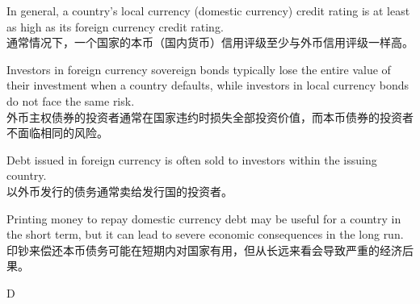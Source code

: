 \documentclass{article}
\begin{document}
\begin{choices}
    \item In general, a country's local currency (domestic currency) credit rating is at least as high as its foreign currency credit rating.\\ 
    通常情况下，一个国家的本币（国内货币）信用评级至少与外币信用评级一样高。

    \item Investors in foreign currency sovereign bonds typically lose the entire value of their investment when a country defaults, while investors in local currency bonds do not face the same risk.\\ 
    外币主权债券的投资者通常在国家违约时损失全部投资价值，而本币债券的投资者不面临相同的风险。
    
    \item Debt issued in foreign currency is often sold to investors within the issuing country.\\ 
    以外币发行的债务通常卖给发行国的投资者。
    
    \item Printing money to repay domestic currency debt may be useful for a country in the short term, but it can lead to severe economic consequences in the long run.\\ 
    印钞来偿还本币债务可能在短期内对国家有用，但从长远来看会导致严重的经济后果。
\end{choices}


\begin{correctanswer}
    D
\end{correctanswer}
\end{document}
